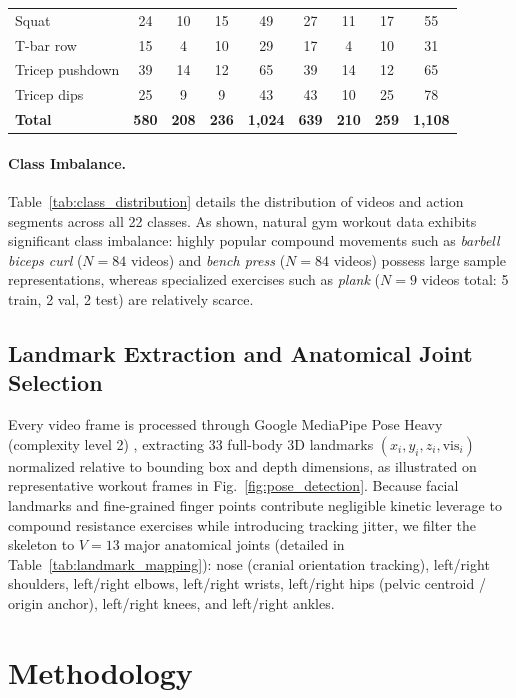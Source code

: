 \documentclass[preprint,12pt]{elsarticle}
\begin{document}
\begin{table}[!t]
{\begin{tabular}{l cccc cccc}
Squat                   & 24 & 10 & 15 & 49  & 27 & 11 & 17 & 55 \\
T-bar row               & 15 &  4 & 10 & 29  & 17 &  4 & 10 & 31 \\
Tricep pushdown         & 39 & 14 & 12 & 65  & 39 & 14 & 12 & 65 \\
Tricep dips             & 25 &  9 &  9 & 43  & 43 & 10 & 25 & 78 \\
\midrule
\textbf{Total}          & \textbf{580} & \textbf{208} & \textbf{236} & \textbf{1,024} & \textbf{639} & \textbf{210} & \textbf{259} & \textbf{1,108} \\
\bottomrule
\end{tabular}
}
\end{table}

\paragraph{Class Imbalance.} Table~\ref{tab:class_distribution} details the distribution of videos and action segments across all 22 classes. As shown, natural gym workout data exhibits significant class imbalance: highly popular compound movements such as \textit{barbell biceps curl} ($N=84$ videos) and \textit{bench press} ($N=84$ videos) possess large sample representations, whereas specialized exercises such as \textit{plank} ($N=9$ videos total: 5 train, 2 val, 2 test) are relatively scarce. 

\subsection{Landmark Extraction and Anatomical Joint Selection}
Every video frame is processed through Google MediaPipe Pose Heavy (complexity level 2) \cite{chuankun2019,bazarevsky2020}, extracting 33 full-body 3D landmarks $(x_i, y_i, z_i, \text{vis}_i)$ normalized relative to bounding box and depth dimensions, as illustrated on representative workout frames in Fig.~\ref{fig:pose_detection}. Because facial landmarks and fine-grained finger points contribute negligible kinetic leverage to compound resistance exercises while introducing tracking jitter, we filter the skeleton to $V=13$ major anatomical joints (detailed in Table~\ref{tab:landmark_mapping}): nose (cranial orientation tracking), left/right shoulders, left/right elbows, left/right wrists, left/right hips (pelvic centroid / origin anchor), left/right knees, and left/right ankles.

\section{Methodology}
\label{sec:methodology}
\end{document}
